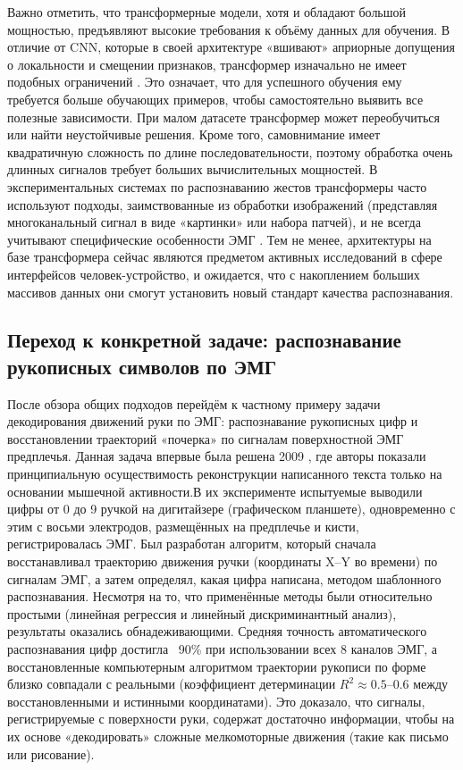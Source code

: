 \documentclass[12pt,a4paper]{article}
\begin{document}
Важно отметить, что трансформерные модели, хотя и обладают большой мощностью, предъявляют высокие требования к объёму данных для обучения. В отличие от CNN, которые в своей архитектуре «вшивают» априорные допущения о локальности и смещении признаков, трансформер изначально не имеет подобных ограничений \cite{33}. Это означает, что для успешного обучения ему требуется больше обучающих примеров, чтобы самостоятельно выявить все полезные зависимости. При малом датасете трансформер может переобучиться или найти неустойчивые решения. Кроме того, самовнимание имеет квадратичную сложность по длине последовательности, поэтому обработка очень длинных сигналов требует больших вычислительных мощностей. В экспериментальных системах по распознаванию жестов трансформеры часто используют подходы, заимствованные из обработки изображений (представляя многоканальный сигнал в виде «картинки» или набора патчей), и не всегда учитывают специфические особенности ЭМГ \cite{34}. Тем не менее, архитектуры на базе трансформера сейчас являются предметом активных исследований в сфере интерфейсов человек-устройство, и ожидается, что с накоплением больших массивов данных они смогут установить новый стандарт качества распознавания.


\subsection*{Переход к конкретной задаче: распознавание рукописных символов по ЭМГ}
После обзора общих подходов перейдём к частному примеру задачи декодирования движений руки по ЭМГ: распознавание рукописных цифр и восстановлении траекторий «почерка» по сигналам поверхностной ЭМГ предплечья. Данная задача впервые была решена 2009 \cite{35}, где авторы показали принципиальную осуществимость реконструкции написанного текста только на основании мышечной активности.В их эксперименте испытуемые выводили цифры от 0 до 9 ручкой на дигитайзере (графическом планшете), одновременно с этим с восьми электродов, размещённых на предплечье и кисти, регистрировалась ЭМГ. Был разработан алгоритм, который сначала восстанавливал траекторию движения ручки (координаты X–Y во времени) по сигналам ЭМГ, а затем определял, какая цифра написана, методом шаблонного распознавания. Несмотря на то, что применённые методы были относительно простыми (линейная регрессия и линейный дискриминантный анализ), результаты оказались обнадеживающими. Средняя точность автоматического распознавания цифр достигла ~90\% при использовании всех 8 каналов ЭМГ\cite{35}, а восстановленные компьютерным алгоритмом траектории рукописи по форме близко совпадали с реальными (коэффициент детерминации $R^2 \approx 0.5$–$0.6$ между восстановленными и истинными координатами). Это доказало, что сигналы, регистрируемые с поверхности руки, содержат достаточно информации, чтобы на их основе «декодировать» сложные мелкомоторные движения (такие как письмо или рисование).
\end{document}
